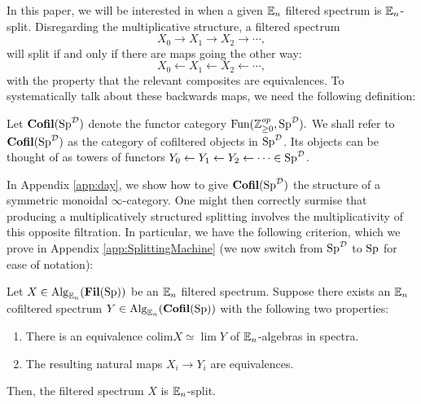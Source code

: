 In this paper, we will be interested in when a given $\operatorname{\mathbb{E}}_n$ filtered spectrum is $\operatorname{\mathbb{E}}_n$-split.  Disregarding the multiplicative structure, a filtered spectrum $$X_0\longrightarrow X_1 \longrightarrow X_2 \longrightarrow \cdots ,$$ will split if and only if there are maps going the other way: $$X_0 \longleftarrow X_1 \longleftarrow X_2 \longleftarrow \cdots,$$ with the property that the relevant composites are equivalences.   To systematically talk about these backwards maps, we need the following definition:

\begin{dfn} Let $\operatorname{\mathbf{Cofil}}(\operatorname{\mathrm{Sp}}^{\operatorname{\mathcal{D}}})$ denote the functor category $\operatorname{\text{Fun}}(\operatorname{\mathbb{Z}}_{\geq 0}^{op}, \operatorname{\mathrm{Sp}}^{\operatorname{\mathcal{D}}}).$  We shall refer to $\operatorname{\mathbf{Cofil}}(\operatorname{\mathrm{Sp}}^{\operatorname{\mathcal{D}}})$ as the category of cofiltered objects in $\operatorname{\mathrm{Sp}}^{\operatorname{\mathcal{D}}}$.  Its objects can be thought of as towers of functors $Y_0\leftarrow Y_1\leftarrow Y_2 \leftarrow \cdots \in \operatorname{\mathrm{Sp}}^{\operatorname{\mathcal{D}}}$.
\end{dfn}

In Appendix \ref{app:day}, we show how to give $\operatorname{\mathbf{Cofil}}(\operatorname{\mathrm{Sp}}^{\operatorname{\mathcal{D}}})$ the structure of a symmetric monoidal $\infty$-category.  One might then correctly surmise that producing a multiplicatively structured splitting involves the multiplicativity of this opposite filtration.  In particular, we have the following criterion, which we prove in Appendix \ref{app:SplittingMachine} (we now switch from $\operatorname{\mathrm{Sp}}^{\operatorname{\mathcal{D}}}$ to $\operatorname{\mathrm{Sp}}$ for ease of notation):

\begin{thm}\label{thm:SplitMachine}%
Let $X\in \operatorname{\mathrm{Alg}}_{\operatorname{\mathbb{E}}_n}(\operatorname{\mathbf{Fil}}(\operatorname{\mathrm{Sp}}))$ be an $\operatorname{\mathbb{E}}_n$ filtered spectrum.  Suppose there exists an $\operatorname{\mathbb{E}}_n$ cofiltered spectrum $Y\in \operatorname{\mathrm{Alg}}_{\operatorname{\mathbb{E}}_n}(\operatorname{\mathbf{Cofil}}(\operatorname{\mathrm{Sp}}))$ with the following two properties:
\begin{enumerate}
\item There is an equivalence $\mathrm{colim } X \simeq \lim Y$ of $\operatorname{\mathbb{E}}_n$-algebras in spectra.
\item The resulting natural maps $X_i \to Y_i$ are equivalences.  
\end{enumerate}
Then, the filtered spectrum $X$ is $\operatorname{\mathbb{E}}_n$-split.
\end{thm}











